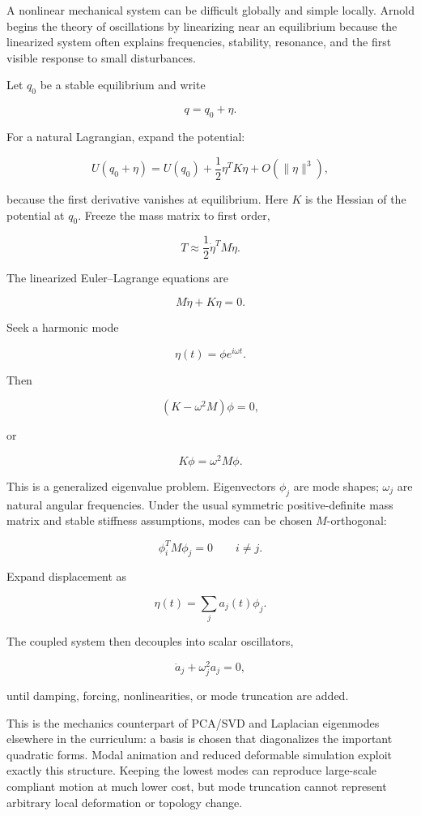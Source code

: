 \hypertarget{06-engine-ii-ch033-small-oscillations-turn-nonlinear-mechanics-into-a-generalized-eigenproblem-near-equilibrium}{}

A nonlinear mechanical system can be difficult globally and simple locally. Arnold begins the theory of oscillations by linearizing near an equilibrium because the linearized system often explains frequencies, stability, resonance, and the first visible response to small disturbances.

Let \(q_0\) be a stable equilibrium and write

\[
q=q_0+\eta.
\]

For a natural Lagrangian, expand the potential:

\[
U(q_0+\eta)
=
U(q_0)
+
\frac12\eta^T K\eta
+
O(\|\eta\|^3),
\]

because the first derivative vanishes at equilibrium. Here \(K\) is the Hessian of the potential at \(q_0\). Freeze the mass matrix to first order,

\[
T
\approx
\frac12\dot\eta^T M\dot\eta.
\]

The linearized Euler--Lagrange equations are

\[
M\ddot\eta+K\eta=0.
\]

Seek a harmonic mode

\[
\eta(t)=\phi e^{i\omega t}.
\]

Then

\[
(K-\omega^2M)\phi=0,
\]

or

\[
\boxed{
K\phi=\omega^2M\phi.
}
\]

This is a generalized eigenvalue problem. Eigenvectors \(\phi_j\) are mode shapes; \(\omega_j\) are natural angular frequencies. Under the usual symmetric positive-definite mass matrix and stable stiffness assumptions, modes can be chosen \(M\)-orthogonal:

\[
\phi_i^T M\phi_j=0
\qquad i\neq j.
\]

Expand displacement as

\[
\eta(t)=\sum_j a_j(t)\phi_j.
\]

The coupled system then decouples into scalar oscillators,

\[
\ddot a_j+\omega_j^2a_j=0,
\]

until damping, forcing, nonlinearities, or mode truncation are added.

This is the mechanics counterpart of PCA/SVD and Laplacian eigenmodes elsewhere in the curriculum: a basis is chosen that diagonalizes the important quadratic forms. Modal animation and reduced deformable simulation exploit exactly this structure. Keeping the lowest modes can reproduce large-scale compliant motion at much lower cost, but mode truncation cannot represent arbitrary local deformation or topology change.

